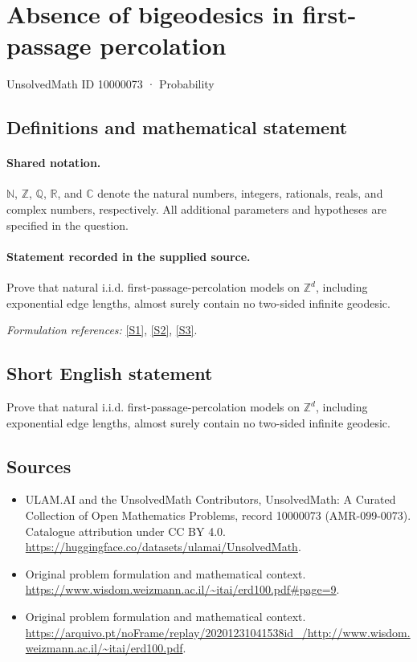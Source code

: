 \documentclass[11pt]{article}
\newcommand{\sref}[2]{\hyperlink{source:#1:#2}{[S#2]}}
\begin{document}
\setcounter{section}{10000072}
\section{Absence of bigeodesics in first-passage percolation}\label{10000073}
{\small UnsolvedMath ID 10000073 · Probability}
\subsection{Definitions and mathematical statement}

\paragraph{Shared notation.}$\mathbb N$, $\mathbb Z$, $\mathbb Q$, $\mathbb R$, and $\mathbb C$ denote the natural numbers, integers, rationals, reals, and complex numbers, respectively. All additional parameters and hypotheses are specified in the question.


\paragraph{Statement recorded in the supplied source.}
Prove that natural i.i.d. first-passage-percolation models on $\mathbb{Z}^d$, including exponential edge lengths, almost surely contain no two-sided infinite geodesic.
\par\smallskip\textit{Formulation references:} \sref{10000073}{1}, \sref{10000073}{2}, \sref{10000073}{3}.
\subsection{Short English statement}
Prove that natural i.i.d. first-passage-percolation models on $\mathbb{Z}^d$, including exponential edge lengths, almost surely contain no two-sided infinite geodesic.
\subsection{Sources}
\begin{itemize}
\item[\hypertarget{source:10000073:1}{S1}] ULAM.AI and the UnsolvedMath Contributors, UnsolvedMath: A Curated Collection of Open Mathematics Problems, record 10000073 (AMR-099-0073). Catalogue attribution under CC BY 4.0.
\url{https://huggingface.co/datasets/ulamai/UnsolvedMath}.
\item[\hypertarget{source:10000073:2}{S2}] Original problem formulation and mathematical context.
\url{https://www.wisdom.weizmann.ac.il/~itai/erd100.pdf#page=9}.
\item[\hypertarget{source:10000073:3}{S3}] Original problem formulation and mathematical context.
\url{https://arquivo.pt/noFrame/replay/20201231041538id_/http://www.wisdom.weizmann.ac.il/~itai/erd100.pdf}.
\end{itemize}
\label{end:10000073}
\end{document}
